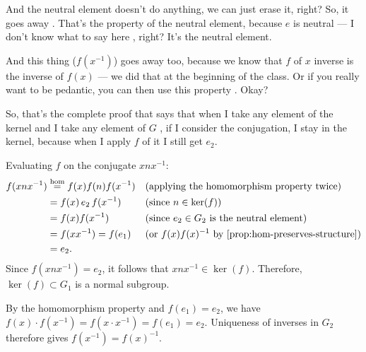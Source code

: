 \begin{proofWrapper}
\begin{speech}[00:48:59 - 00:50:37]
And the neutral element doesn't do anything, we can just erase it, right? So, it goes away . That's the property of the neutral element, because $e$ is neutral --- I don't know what to say here , right? It's the neutral element.

And this thing ($f(x^{-1})$) goes away too, because we know that $f$ of $x$ inverse is the inverse of $f(x)$ --- we did that at the beginning of the class. Or if you really want to be pedantic, you can then use this property . Okay?

So, that's the complete proof that says that when I take any element of the kernel  and I take any element of $G$ , if I consider the conjugation, I stay in the kernel, because when I apply $f$ of it I still get $e_2$.
\end{speech}

\begin{content}
Evaluating $f$ on the conjugate $x n x^{-1}$:
\begin{align*}
f(x n x^{-1}) &\stackrel{\text{hom}}{=} f(x) f(n) f(x^{-1}) && \text{(applying the homomorphism property twice)} \\
&= f(x) \, e_2 \, f(x^{-1}) && \text{(since } n \in \ker(f) \text{)} \\
&= f(x) f(x^{-1}) && \text{(since } e_2 \in G_2 \text{ is the neutral element)} \\
&= f(x x^{-1}) = f(e_1) && \text{(or } f(x) f(x)^{-1}\text{ by \cref{prop:hom-preserves-structure})} \\
&= e_2.
\end{align*}
Since $f(x n x^{-1}) = e_2$, it follows that $x n x^{-1} \in \ker(f)$. Therefore, $\ker(f) \subset G_1$ is a normal subgroup.

\begin{steps}[Checking Why \texorpdfstring{$f(x^{-1}) = f(x)^{-1}$}{f(x\textasciicircum -1) = f(x)\textasciicircum -1}]
By the homomorphism property and $f(e_1) = e_2$, we have $f(x) \cdot f(x^{-1}) = f(x \cdot x^{-1}) = f(e_1) = e_2$. Uniqueness of inverses in $G_2$ therefore gives $f(x^{-1}) = f(x)^{-1}$.
\end{steps}
\end{content}

\end{proofWrapper}

